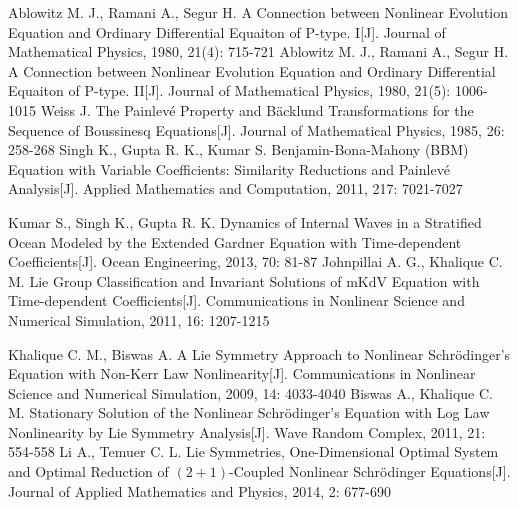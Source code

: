 \begin{thebibliography}{0}
 Ablowitz M. J., Ramani A., Segur H. A Connection between Nonlinear Evolution Equation and Ordinary Differential Equaiton of P-type. I[J]. Journal of Mathematical Physics, 1980, 21(4): 715-721
 Ablowitz M. J., Ramani A., Segur H. A Connection between Nonlinear Evolution Equation and Ordinary Differential Equaiton of P-type. II[J]. Journal of Mathematical Physics, 1980, 21(5): 1006-1015
 Weiss J. The Painlev\'{e} Property and B\"{a}cklund Transformations for the Sequence of Boussinesq Equations[J]. Journal of Mathematical Physics, 1985, 26: 258-268
 Singh K., Gupta R. K., Kumar S. Benjamin-Bona-Mahony (BBM) Equation with Variable Coefficients: Similarity Reductions and Painlev\'{e} Analysis[J]. Applied Mathematics and Computation, 2011, 217: 7021-7027

 Kumar S., Singh K., Gupta R. K. Dynamics of Internal Waves in a Stratified Ocean Modeled by the Extended Gardner Equation with Time-dependent Coefficients[J]. Ocean Engineering, 2013, 70: 81-87%
     Johnpillai A. G., Khalique C. M. Lie Group Classification and Invariant Solutions of mKdV Equation with Time-dependent Coefficients[J]. Communications in Nonlinear Science and Numerical Simulation, 2011, 16: 1207-1215


 Khalique C. M., Biswas A. A Lie Symmetry Approach to Nonlinear Schr\"{o}dinger's Equation with Non-Kerr Law Nonlinearity[J]. Communications in Nonlinear Science and Numerical Simulation, 2009, 14: 4033-4040
 Biswas A., Khalique C. M. Stationary Solution of the Nonlinear Schr\"{o}dinger's Equation with Log Law Nonlinearity by Lie Symmetry Analysis[J]. Wave Random Complex, 2011, 21: 554-558
 Li A., Temuer C. L. Lie Symmetries, One-Dimensional Optimal System and Optimal Reduction of $(2+1)$-Coupled Nonlinear Schr\"{o}dinger Equations[J]. Journal of Applied Mathematics and Physics, 2014, 2: 677-690


\end{thebibliography}
